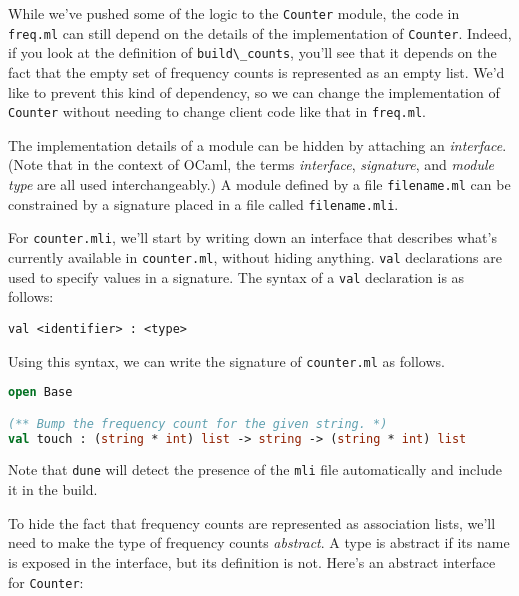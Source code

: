While we've pushed some of the logic to the
\passthrough{\lstinline!Counter!} module, the code in
\passthrough{\lstinline!freq.ml!} can still depend on the details of the
implementation of \passthrough{\lstinline!Counter!}. Indeed, if you look
at the definition of \passthrough{\lstinline!build\_counts!}, you'll see
that it depends on the fact that the empty set of frequency counts is
represented as an empty list. We'd like to prevent this kind of
dependency, so we can change the implementation of
\passthrough{\lstinline!Counter!} without needing to change client code
like that in \passthrough{\lstinline!freq.ml!}.

The implementation details of a module can be hidden by attaching an
\emph{interface}. (Note that in the context of OCaml, the terms
\emph{interface}, \emph{signature}, and \emph{module type} are all used
interchangeably.) A module defined by a file
\passthrough{\lstinline!filename.ml!} can be constrained by a signature
placed in a file called \passthrough{\lstinline!filename.mli!}.

For \passthrough{\lstinline!counter.mli!}, we'll start by writing down
an interface that describes what's currently available in
\passthrough{\lstinline!counter.ml!}, without hiding anything.
\passthrough{\lstinline!val!} declarations are used to specify values in
a signature. The syntax of a \passthrough{\lstinline!val!} declaration
is as follows:

\begin{lstlisting}
val <identifier> : <type>
\end{lstlisting}

Using this syntax, we can write the signature of
\passthrough{\lstinline!counter.ml!} as follows.

\begin{lstlisting}[language=Caml]
open Base

(** Bump the frequency count for the given string. *)
val touch : (string * int) list -> string -> (string * int) list
\end{lstlisting}

Note that \passthrough{\lstinline!dune!} will detect the presence of the
\passthrough{\lstinline!mli!} file automatically and include it in the
build.

To hide the fact that frequency counts are represented as association
lists, we'll need to make the type of frequency counts \emph{abstract}.
A type is abstract if its name is exposed in the interface, but its
definition is not. Here's an abstract interface for
\passthrough{\lstinline!Counter!}:

